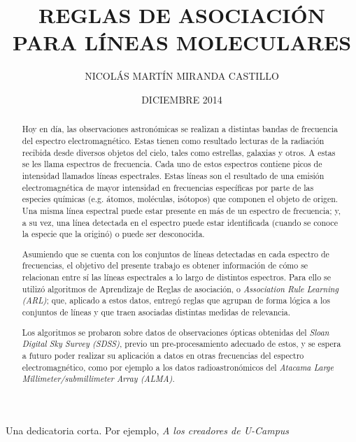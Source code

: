\documentclass[upright, contnum]{umemoria}
\author{NICOL\'AS MART\'IN MIRANDA CASTILLO}
\title{REGLAS DE ASOCIACI\'ON PARA L\'INEAS MOLECULARES}
\date{DICIEMBRE 2014}
\begin{document}
\frontmatter
\maketitle

\begin{abstract}
Hoy en día, las observaciones astronómicas se realizan a distintas bandas de frecuencia del espectro electromagnético. Estas tienen como resultado lecturas de la radiación recibida desde diversos objetos del cielo, tales como estrellas, galaxias y otros. A estas se les llama espectros de frecuencia. Cada uno de estos espectros contiene picos de intensidad llamados líneas espectrales. Estas líneas son el resultado de una emisión electromagnética de mayor intensidad en frecuencias específicas por parte de las especies químicas (e.g. átomos, moléculas, isótopos) que componen el objeto de origen. Una misma línea espectral puede estar presente en más de un espectro de frecuencia; y, a su vez, una línea detectada en el espectro puede estar identificada (cuando se conoce la especie que la originó) o puede ser desconocida.

Asumiendo que se cuenta con los conjuntos de líneas detectadas en cada espectro de frecuencias, el objetivo del presente trabajo es obtener información de cómo se relacionan entre sí las líneas espectrales a lo largo de distintos espectros. Para ello se utilizó algoritmos de Aprendizaje de Reglas de asociación, o \textit{Association Rule Learning (ARL)}; que, aplicado a estos datos, entregó reglas que agrupan de forma lógica a los conjuntos de líneas y que traen asociadas distintas medidas de relevancia.

Los algoritmos se probaron sobre datos de observaciones ópticas obtenidas del \textit{Sloan Digital Sky Survey (SDSS)}, previo un pre-procesamiento adecuado de estos, y se espera a futuro poder realizar su aplicación a datos en otras frecuencias del espectro electromagnético, como por ejemplo a los datos radioastronómicos del \textit{Atacama Large Millimeter/submillimeter Array (ALMA)}.
\end{abstract}

\begin{dedicatoria}
Una dedicatoria corta. Por ejemplo, \emph{A los creadores de U-Campus}
\end{dedicatoria}

\begin{thanks}
\lipsum[1-2]
\end{thanks}

\cleardoublepage
\begin{spacing}{1}
\tableofcontents
\listoffigures
\end{spacing}

\mainmatter








\nocite{*}


\end{document}
